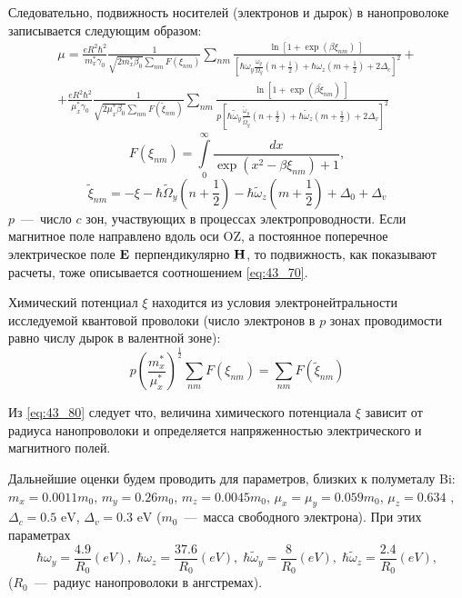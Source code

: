 Следовательно, подвижность носителей (электронов и дырок) в нанопроволоке записывается следующим образом:
\begin{multline} \label{eq:43_70} 
\mu =\frac{eR^2{\hbar }^2}{m^*_x{\gamma }_0}\frac{1}{\sqrt{2m^*_x{\beta }_0}\sum_{nm}{F\left({\xi }_{nm}\right)}}\sum_{nm}{\frac{{\ln \left[1+{\exp \left(\beta {\xi }_{nm}\right)\ }\right]\ }}{{\left[\hbar {\omega }_y\frac{{\omega }_y}{{\Omega }_y}\left(n+\frac{1}{2}\right)+\hbar {\omega }_z\left(m+\frac{1}{2}\right)+2{\Delta }_c\right]}^2}}+\\
+\frac{eR^2{\hbar }^2}{{\mu }^*_x \gamma_0}\frac{1}{\sqrt{2{\mu}^*_x \beta_0}\sum_{nm}{F\left({\widetilde{\xi }}_{nm}\right)}}\sum_{nm}{\frac{{\ln \left[1+{\exp \left(\beta {\widetilde{\xi }}_{nm}\right)\ }\right]\ }}{p{\left[\hbar {\widetilde{\omega }}_y\frac{{\widetilde{\omega }}_y}{{\widetilde{\Omega }}_y}\left(n+\frac{1}{2}\right)+\hbar {\widetilde{\omega }}_z\left(m+\frac{1}{2}\right)+2{\Delta }_v\right]}^2}} 
\end{multline}
\[
F\left(\xi_{nm}\right)=\int\limits^{\infty }_0 {\frac{dx}{\exp \left(x^2-\beta {\xi }_{nm}\right) +1}},
\]
\[
{\widetilde{\xi }}_{nm}=-\xi -\hbar {\widetilde{\Omega }}_y\left(n+\frac{1}{2}\right)-\hbar {\widetilde{\omega }}_z\left(m+\frac{1}{2}\right)+{\Delta }_0+{\Delta }_v
\]
$p$~---~число $c$ зон, участвующих в процессах электропроводности. Если магнитное поле направлено вдоль оси OZ, а постоянное поперечное электрическое поле $\boldsymbol{\mathbf{E}}$ перпендикулярно $\boldsymbol{\mathbf{H}}$, то подвижность, как показывают расчеты, тоже описывается соотношением \eqref{eq:43_70}.

Химический потенциал $\xi $ находится из условия электронейтральности исследуемой квантовой проволоки (число электронов в $p$ зонах проводимости равно числу дырок в валентной зоне):
\begin{equation} \label{eq:43_80} 
p{\left(\frac{m^*_x}{{\mu }^*_x}\right)}^{\frac{1}{2}}\sum_{nm}{F\left({\xi }_{nm}\right)}=\sum_{nm}{F\left({\widetilde{\xi }}_{nm}\right)} 
\end{equation}

Из \eqref{eq:43_80} следует что, величина химического потенциала $\xi $ зависит от радиуса нанопроволоки и определяется напряженностью электрического и магнитного полей.

Дальнейшие оценки будем проводить для параметров, близких к полуметалу Bi: $m_x=0.0011m_0$, $m_y=0.26m_0$, $m_z=0.0045m_0$, ${\mu }_x={\mu }_y= 0.059 m_0$, $\mu_z = 0.634$ \cite{Levin2009a}, $\Delta_c=0.5\text{ eV}$, $\Delta_v =0.3\text{ eV}$ ($m_0$~---~масса свободного электрона). При этих параметрах
\[
\hbar {\omega }_y=\frac{4.9}{R_0}\left(eV\right),\;
\hbar {\omega }_z=\frac{37.6}{R_0}\left(eV\right),\;
\hbar {\widetilde{\omega }}_y=\frac{8}{R_0}\left(eV\right),\;
\hbar {\widetilde{\omega }}_z=\frac{2.4}{R_0}\left(eV\right),
\] 
($R_0$~---~радиус нанопроволоки в ангстремах).

